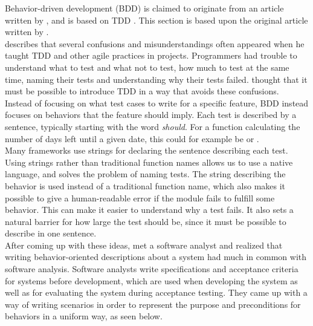 Behavior-driven development (BDD) is claimed to originate from an
article written by \citet{web:dan_north}, and is based on
TDD \cite{wiki:bdd}. This section is based upon the original article
written by \citeauthor{web:dan_north}.\\

\citeauthor{web:dan_north} describes that several confusions and
misunderstandings often appeared when he taught TDD and other agile
practices in projects. Programmers had trouble to understand what to
test and what not to test, how much to test at the same time, naming
their tests and understanding why their tests failed.
\citeauthor{web:dan_north} thought that it must be possible to introduce
TDD in a way that avoids these confusions.\\

Instead of focusing on what test cases to write for a specific feature,
BDD instead focuses on behaviors that the feature should imply. Each
test is described by a sentence, typically starting with the word
\emph{should}. For a function calculating the number of days left until
a given date, this could for example be  or .\\

Many frameworks use strings for declaring the sentence describing each
test. Using strings rather than traditional function names allows us to
use a native language, and solves the problem of naming tests. The
string describing the behavior is used instead of a traditional function
name, which also makes it possible to give a human-readable error if the
module fails to fulfill some behavior. This can make it easier to
understand why a test fails. It also sets a natural barrier for how
large the test should be, since it must be possible to describe in one
sentence.\\

After coming up with these ideas, \citeauthor{web:dan_north} met a
software analyst and realized that writing behavior-oriented
descriptions about a system had much in common with software analysis.
Software analysts write specifications and acceptance criteria for
systems before development, which are used when developing the system as
well as for evaluating the system during acceptance testing. They came
up with a way of writing scenarios in order to represent the purpose and
preconditions for behaviors in a uniform way, as seen below.\\

